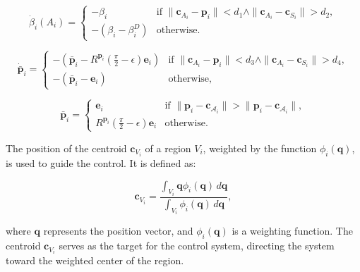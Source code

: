         \begin{equation}
            \dot{\beta}_i(A_i) = 
            \begin{cases}
                -\beta_i & \text{if } \|\mathbf{c}_{A_i} - \mathbf{p}_i\| < d_1 \land \|\mathbf{c}_{A_i} - \mathbf{c}_{S_i}\| > d_2, \\
                -(\beta_i - \beta_i^D) & \text{otherwise.}
            \end{cases}
        \end{equation}
        
        \begin{equation}
            \mathbf{\dot{\bar{p}}}_i = 
            \begin{cases}
                -(\mathbf{\bar{p}}_i - R^{\mathbf{p}_i} (\frac{\pi}{2} - \epsilon) \mathbf{e}_i) & \text{if } \|\mathbf{c}_{A_i} - \mathbf{p}_i\| < d_3 \land \|\mathbf{c}_{A_i} - \mathbf{c}_{S_i}\| > d_4, \\
                -(\mathbf{\bar{p}}_i - \mathbf{e}_i) & \text{otherwise,}
            \end{cases}
        \end{equation}
        
        \[
            \mathbf{\bar{p}}_i = 
            \begin{cases}
            \mathbf{e}_i & \text{if } \|\mathbf{p}_i - \mathbf{c}_{\mathcal{A}_i}\| > \|\mathbf{p}_i - \mathbf{c}_{\mathcal{A}_i}\|, \\
            R^{\mathbf{p}_i} (\frac{\pi}{2} - \epsilon) \mathbf{e}_i & \text{otherwise.}
            \end{cases}
        \]
            

        
        The position of the centroid \( \mathbf{c}_{V_i} \) of a region \( V_i \), weighted by the function \( \phi_i(\mathbf{q}) \), is used to guide the control. It is defined as:

        \begin{equation}
            \mathbf{c}_{V_i} = \frac{\int_{V_i} \mathbf{q} \phi_i(\mathbf{q}) \, d\mathbf{q}}{\int_{V_i} \phi_i(\mathbf{q}) \, d\mathbf{q}},
        \end{equation}

        where \( \mathbf{q} \) represents the position vector, and \( \phi_i(\mathbf{q}) \) is a weighting function. 
        The centroid \( \mathbf{c}_{V_i} \) serves as the target for the control system, directing the system toward the weighted center of the region.

